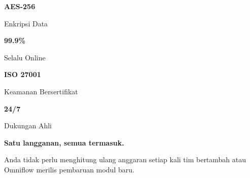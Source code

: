 \documentclass[a4paper]{article}
\begin{document}
\vspace{10pt}

\noindent
\colorbox{BluePrimary}{%
\begin{minipage}{\dimexpr\textwidth-2\fboxsep}
\hspace{6pt}%
\begin{minipage}[t][1.25cm][c]{0.24\linewidth}
    \begin{center}
        {\fontsize{18}{22}\selectfont\bfseries\color{White} AES-256}\par
        {\fontsize{8}{10}\selectfont\color{BlueMid} Enkripsi Data}
    \end{center}
\end{minipage}%
\hfill
\begin{minipage}[t][1.25cm][c]{0.24\linewidth}
    \begin{center}
        {\fontsize{18}{22}\selectfont\bfseries\color{White} 99.9\%}\par
        {\fontsize{8}{10}\selectfont\color{BlueMid} Selalu Online}
    \end{center}
\end{minipage}%
\hfill
\begin{minipage}[t][1.25cm][c]{0.24\linewidth}
    \begin{center}
        {\fontsize{18}{22}\selectfont\bfseries\color{White} ISO 27001}\par
        {\fontsize{8}{10}\selectfont\color{BlueMid} Keamanan Bersertifikat}
    \end{center}
\end{minipage}%
\hfill
\begin{minipage}[t][1.25cm][c]{0.24\linewidth}
    \begin{center}
        {\fontsize{18}{22}\selectfont\bfseries\color{White} 24/7}\par
        {\fontsize{8}{10}\selectfont\color{BlueMid} Dukungan Ahli}
    \end{center}
\end{minipage}%
\hspace{6pt}%
\end{minipage}}

\vspace{8pt}

{\setlength{\fboxsep}{7pt}\setlength{\fboxrule}{0pt}%
\noindent\colorbox{BlueBg}{%
    \begin{minipage}{\dimexpr\textwidth-2\fboxsep\relax}
        \centering
        {\fontsize{9.5}{12}\selectfont\bfseries\color{BluePrimary} Satu langganan, semua termasuk.}\par\vspace{1pt}
        {\fontsize{8.5}{11}\selectfont\color{TextDark} Anda tidak perlu menghitung ulang anggaran setiap kali tim bertambah atau Omniflow merilis pembaruan modul baru.}
    \end{minipage}}}
\end{document}
